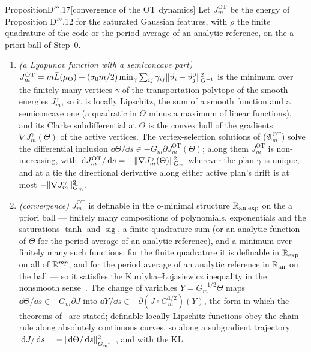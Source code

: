 \begin{thm}{Proposition}{D$'''$.17}[convergence of the OT dynamics]
Let $J_m^{\mathrm{OT}}$ be the energy of Proposition D$'''$.12 for the saturated Gaussian features, with $\rho$ the
finite quadrature of the code or the period average of an analytic reference, on the a priori ball of Step~0.
\begin{enumerate}[label=\textup{(\roman*)}]
  \item \emph{(a Lyapunov function with a semiconcave part)}
    $J_m^{\mathrm{OT}} = m\bar L(\mu_\Theta)
    + (\sigma_0m/2)\min_\gamma\sum_{ij}\gamma_{ij}\lVert \vartheta_i - \vartheta^0_j\rVert^2_{G^{-1}}$ is the minimum over
    the finitely many vertices $\gamma$ of the transportation polytope of the smooth energies $J^\gamma_m$, so it is
    locally Lipschitz, the sum of a smooth function and a semiconcave one (a quadratic in $\Theta$ minus a maximum of
    linear functions), and its Clarke subdifferential at $\Theta$ is the convex hull of the gradients
    $\nabla J^\gamma_m(\Theta)$ of the active vertices. The vertex-selection solutions of
    \textup{($\mathfrak{A}_m^{\mathrm{OT}}$)} solve the differential inclusion
    $\dd\Theta/\dd s\in-G_m\partial J_m^{\mathrm{OT}}(\Theta)$; along them $J_m^{\mathrm{OT}}$ is non-increasing,
    with $\,\mathrm{d} J_m^{\mathrm{OT}}/\,\mathrm{d} s = -\lVert \nabla J^\gamma_m(\Theta)\rVert^2_{G_m}$ wherever the plan $\gamma$ is
    unique, and at a tie the directional derivative along either active plan's drift is at most
    $-\lVert \nabla J^\gamma_m\rVert^2_{G_m}$.
  \item \emph{(convergence)} $J_m^{\mathrm{OT}}$ is definable in the o-minimal structure $\mathbb{R}_{\mathrm{an},\exp}$ on
    the a priori ball --- finitely many compositions of polynomials, exponentials and the saturations $\tanh$ and
    $\operatorname{sig}$, a finite quadrature sum (or an analytic function of $\Theta$ for the period average of an
    analytic reference), and a minimum over finitely many such functions; for the finite quadrature it is definable in
    $\mathbb{R}_{\exp}$ on all of $\mathbb{R}^{mp}$, and for the period average of an analytic reference in $\mathbb{R}_{\mathrm{an}}$ on the
    ball --- so it satisfies the Kurdyka--{\L}ojasiewicz inequality in the nonsmooth sense~\cite{S43}. The change of
    variables $Y = G_m^{-1/2}\Theta$ maps $\dd\Theta/\dd s\in-G_m\partial J$ into
    $\dd Y/\dd s\in-\partial(J\circ G_m^{1/2})(Y)$, the form in which the theorems of~\cite{S43} are stated;
    definable locally Lipschitz functions obey the chain rule along absolutely continuous curves, so along a
    subgradient trajectory $\,\mathrm{d} J/\,\mathrm{d} s = -\lVert \,\mathrm{d}\Theta/\,\mathrm{d} s\rVert^2_{G_m^{-1}}$~\cite{S43}, and with the KL

\end{enumerate}
\end{thm}
